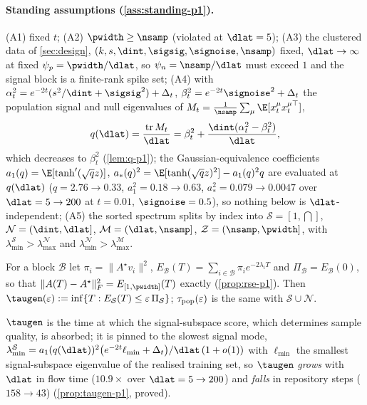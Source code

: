 \paragraph{Standing assumptions (\cref{ass:standing-p1}).}
(A1) fixed $t$; (A2) $\pwidth\ge\nsamp$ (violated at $\dlat=5$); (A3) the clustered data of \cref{sec:design}, $(k,s,\dint,\sigsig,\signoise,\nsamp)$ fixed, $\dlat\to\infty$ at fixed $\psi_p=\pwidth/\dlat$, so $\psi_n=\nsamp/\dlat$ must exceed $1$ and the signal block is a finite-rank spike set; (A4) with $\alpha_t^2=e^{-2t}(s^2/\dint+\sigsig^2)+\Delta_t$, $\beta_t^2=e^{-2t}\signoise^2+\Delta_t$ the population signal and null eigenvalues of $M_t=\tfrac1\nsamp\sum_\mu\E[x_t^\mu x_t^{\mu\top}]$,
\begin{equation}\label{eq:fourbulk-q-main}
q(\dlat)=\frac{\operatorname{tr}M_t}{\dlat}=\beta_t^2+\frac{\dint(\alpha_t^2-\beta_t^2)}{\dlat},
\end{equation}
which decreases to $\beta_t^2$ (\cref{lem:q-p1}); the Gaussian-equivalence coefficients $a_1(q)=\E[\tanh'(\sqrt qz)]$, $a_*(q)^2=\E[\tanh(\sqrt qz)^2]-a_1(q)^2q$ \citep{pennington2017nonlinear,benigni2021eigenvalue,goldt2022gaussian,hu2022universality} are evaluated at $q(\dlat)$ ($q=2.76\to0.33$, $a_1^2=0.18\to0.63$, $a_*^2=0.079\to0.0047$ over $\dlat=5\to200$ at $t=0.01$, $\signoise=0.5$), so nothing below is $\dlat$-independent; (A5) the sorted spectrum splits by index into $\mathcal S=[1,\dint]$, $\mathcal N=(\dint,\dlat]$, $\mathcal M=(\dlat,\nsamp]$, $\mathcal Z=(\nsamp,\pwidth]$, with $\lambda^{\mathcal S}_{\min}>\lambda^{\mathcal N}_{\max}$ and $\lambda^{\mathcal N}_{\min}>\lambda^{\mathcal M}_{\max}$.

\begin{definition}\label{def:taugen-main}
For a block $\mathcal B$ let $\pi_i=\|A^\star v_i\|^2$, $E_{\mathcal B}(T)=\sum_{i\in\mathcal B}\pi_ie^{-2\lambda_iT}$ and $\Pi_{\mathcal B}=E_{\mathcal B}(0)$, so that $\|A(T)-A^\star\|_F^2=E_{[1,\pwidth]}(T)$ exactly (\cref{prop:rse-p1}). Then $\taugen(\varepsilon):=\inf\{T:E_{\mathcal S}(T)\le\varepsilon\,\Pi_{\mathcal S}\}$; $\tau_{\rm pop}(\varepsilon)$ is the same with $\mathcal S\cup\mathcal N$.
\end{definition}
$\taugen$ is the time at which the signal-subspace score, which determines sample quality, is absorbed; it is pinned to the slowest signal mode, $\lambda^{\mathcal S}_{\min}=a_1(q(\dlat))^2\bigl(e^{-2t}\ell_{\min}+\Delta_t\bigr)/\dlat\,(1+o(1))$ with $\ell_{\min}$ the smallest signal-subspace eigenvalue of the realised training set, so $\taugen$ \emph{grows} with $\dlat$ in flow time ($10.9\times$ over $\dlat=5\to200$) and \emph{falls} in repository steps ($158\to43$) (\cref{prop:taugen-p1}, proved).

